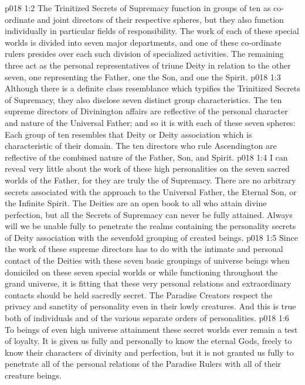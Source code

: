 \vs p018 1:2 The Trinitized Secrets of Supremacy function in groups of ten as co\hyp{}ordinate and joint directors of their respective spheres, but they also function individually in particular fields of responsibility. The work of each of these special worlds is divided into seven major departments, and one of these co\hyp{}ordinate rulers presides over each such division of specialized activities. The remaining three act as the personal representatives of triune Deity in relation to the other seven, one representing the Father, one the Son, and one the Spirit.
\vs p018 1:3 Although there is a definite class resemblance which typifies the Trinitized Secrets of Supremacy, they also disclose seven distinct group characteristics. The ten supreme directors of Divinington affairs are reflective of the personal character and nature of the Universal Father; and so it is with each of these seven spheres: Each group of ten resembles that Deity or Deity association which is characteristic of their domain. The ten directors who rule Ascendington are reflective of the combined nature of the Father, Son, and Spirit.
\vs p018 1:4 \pc I can reveal very little about the work of these high personalities on the seven sacred worlds of the Father, for they are truly the  of Supremacy. There are no arbitrary secrets associated with the approach to the Universal Father, the Eternal Son, or the Infinite Spirit. The Deities are an open book to all who attain divine perfection, but all the Secrets of Supremacy can never be fully attained. Always will we be unable fully to penetrate the realms containing the personality secrets of Deity association with the sevenfold grouping of created beings.
\vs p018 1:5 Since the work of these supreme directors has to do with the intimate and personal contact of the Deities with these seven basic groupings of universe beings when domiciled on these seven special worlds or while functioning throughout the grand universe, it is fitting that these very personal relations and extraordinary contacts should be held sacredly secret. The Paradise Creators respect the privacy and sanctity of personality even in their lowly creatures. And this is true both of individuals and of the various separate orders of personalities.
\vs p018 1:6 To beings of even high universe attainment these secret worlds ever remain a test of loyalty. It is given us fully and personally to know the eternal Gods, freely to know their characters of divinity and perfection, but it is not granted us fully to penetrate all of the personal relations of the Paradise Rulers with all of their creature beings.
